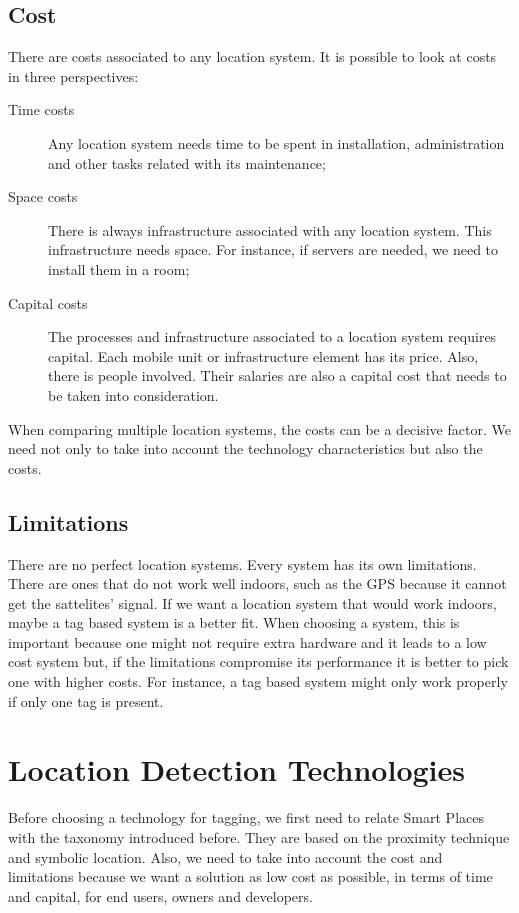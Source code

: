 \subsection{Cost}
\label{sub:background_cost}
There are costs associated to any location system.
It is possible to look at costs in three perspectives:
\begin{description}
  \item[Time costs] Any location system needs time to be spent in installation, administration and other tasks related with its maintenance;
  \item[Space costs] There is always infrastructure associated with any location system. This infrastructure needs space. For instance, if servers are needed, we need to install them in a room;
  \item[Capital costs] The processes and infrastructure associated to a location system requires capital.
  Each mobile unit or infrastructure element has its price. Also, there is people involved. Their salaries are also a capital cost that needs to be taken into consideration.
\end{description}

When comparing multiple location systems, the costs can be a decisive factor. We need not only to take into account the technology characteristics but also the costs.

\subsection{Limitations}
\label{sub:background_limitations}
There are no perfect location systems. Every system has its own limitations.
There are ones that do not work well indoors, such as the \gls{GPS} because it cannot get the sattelites' signal.
If we want a location system that would work indoors, maybe a tag based system is a better fit.
When choosing a system, this is important because one might not require extra hardware and it leads to a low cost system but, if the limitations compromise its performance it is better to pick one with higher costs.
For instance, a tag based system might only work properly if only one tag is present.

\section{Location Detection Technologies}
\label{sec:background_technologies}
Before choosing a technology for tagging, we first need to relate Smart Places with the taxonomy introduced before.
They are based on the proximity technique and symbolic location.
Also, we need to take into account the cost and limitations because we want a solution as low cost as possible, in terms of time and capital, for end users, owners and developers.


